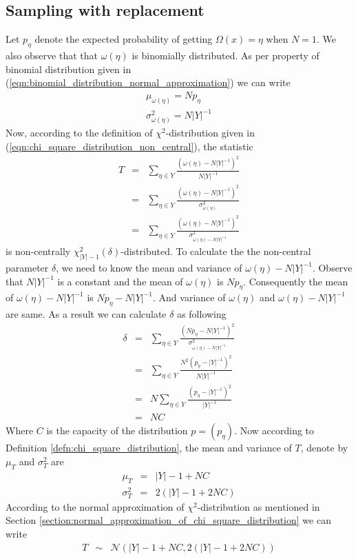 \subsection{Sampling with replacement} \label{section:sampling_with_replacement} Let $p_{\eta}$ denote the expected probability of getting $\Omega(x) = \eta$ when $N=1$. We also observe that that $\omega({\eta})$ is binomially distributed. As per property of binomial distribution given in (\ref{eqn:binomial_distribution_normal_approximation}) we can write 
\begin{eqnarray}
\mu_{\omega({\eta})} = Np_{\eta} \\
\sigma^2_{\omega({\eta})} = N|Y|^{-1}
\end{eqnarray}
Now, according to the definition of $\chi^2$-distribution given in (\ref{eqn:chi_square_distribution_non_central}), the statistic
\begin{eqnarray*}
T&=&\displaystyle\sum_{\eta \in Y}\frac{\left( \omega(\eta) - N|Y|^{-1}\right)^2}{N|Y|^{-1}} \\ 
&=& \displaystyle\sum_{\eta \in Y}\frac{\left( \omega(\eta) - N|Y|^{-1}\right)^2}{\sigma^2_{\omega({\eta})}}\\
&=& \displaystyle\sum_{\eta \in Y}\frac{\left( \omega(\eta) - N|Y|^{-1}\right)^2}{\sigma^2_{\omega({\eta})- N|Y|^{-1}}}
\end{eqnarray*}
is non-centrally $\chi^2_{|Y|-1}(\delta)$-distributed. To calculate the the non-central parameter $\delta$, we need to know the mean and variance of $\omega(\eta) - N|Y|^{-1}$. Observe that $N|Y|^{-1}$ is a constant and the mean of $\omega(\eta)$ is $Np_{\eta}$. Consequently the mean of $\omega(\eta) - N|Y|^{-1}$ is $Np_{\eta} -N|Y|^{-1}$. And variance of $\omega(\eta)$ and $\omega(\eta) - N|Y|^{-1}$ are same. As a result we can calculate $\delta$ as following
\begin{eqnarray*}
\delta &=& \displaystyle\sum_{\eta \in Y} \frac{\left(Np_{\eta} -N|Y|^{-1} \right)^2}{\sigma^2_{\omega({\eta})- N|Y|^{-1}}}\\
&=& \displaystyle\sum_{\eta \in Y} \frac{N^2\left(p_{\eta} -|Y|^{-1} \right)^2}{N|Y|^{-1}}\\
&=& N \displaystyle\sum_{\eta \in Y} \frac{\left(p_{\eta} -|Y|^{-1} \right)^2}{|Y|^{-1}} \\
&=& NC 
\end{eqnarray*}Where $C$ is the capacity of the distribution $p=(p_{\eta})$. Now according to Definition \ref{defn:chi_square_distribution}, the mean and variance of $T$, denote by $\mu_T$ and $\sigma^2_T$ are 
\begin{eqnarray*}
\mu_T &=& |Y| - 1 + NC\\
\sigma^2_T &=& 2\left(|Y| -1 + 2NC\right) 
\end{eqnarray*}According to the normal approximation of $\chi^2$-distribution as mentioned in Section \ref{section:normal_approximation_of_chi_square_distribution} we can write 
\begin{eqnarray}
T &\sim & \mathcal{N} \left( |Y| - 1 + NC, 2\left(|Y| -1 + 2NC\right) \right)
\end{eqnarray}

